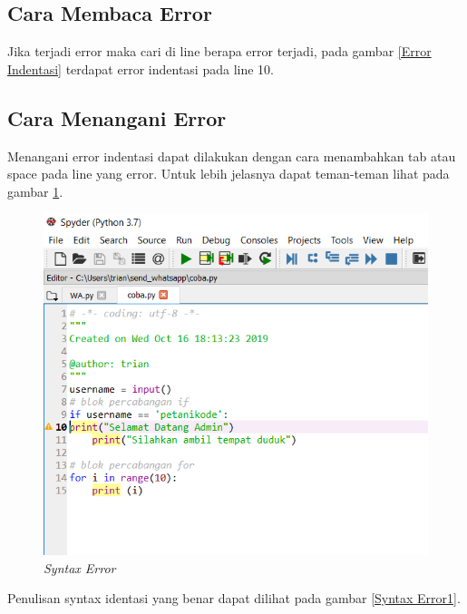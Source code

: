 \subsection{Cara Membaca Error}
Jika terjadi error maka cari di line berapa error terjadi, pada gambar \ref{Error Indentasi} terdapat error indentasi pada line 10.


\subsection{Cara Menangani Error}
Menangani error indentasi dapat dilakukan dengan cara menambahkan tab atau space pada line yang error. Untuk lebih jelasnya dapat teman-teman lihat pada gambar \ref{Syntax Error}.
\begin{figure}[H]
    \centering
    \includegraphics[scale=0.7]{figures/indentasi}
    \caption{\textit{Syntax Error}}
    \label{Syntax Error}
\end{figure}
Penulisan syntax identasi yang benar dapat dilihat pada gambar \ref{Syntax Error1}.
